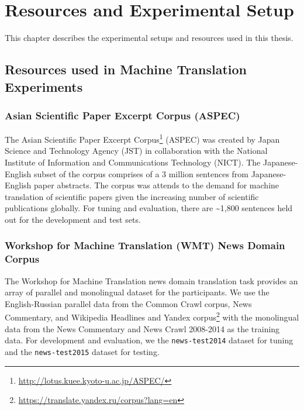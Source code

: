 \chapter{Resources and Experimental Setup}
\label{chap:setup}

This chapter describes the experimental setups and resources used in this thesis.

\section{Resources used in Machine Translation Experiments}

\subsection{Asian Scientific Paper Excerpt Corpus (ASPEC)}

The Asian Scientific Paper Excerpt Corpus\footnote{\url{http://lotus.kuee.kyoto-u.ac.jp/ASPEC/}} (ASPEC) was created by Japan Science and Technology Agency (JST) in collaboration with the National Institute of Information and Communications Technology (NICT). 
The Japanese-English subset of the corpus comprises of a 3 million sentences from Japanese-English paper abstracts. The corpus was attends to the demand for machine translation of scientific papers given the increasing number of scientific publications globally. 
For tuning and evaluation, there are \textasciitilde 1,800 sentences held out for the development and test sets.


\subsection{Workshop for Machine Translation (WMT) News Domain Corpus}

The Workshop for Machine Translation news domain translation task provides an array of parallel and monolingual dataset for the participants. We use the English-Russian parallel data from the Common Crawl corpus, News Commentary, and Wikipedia Headlines and Yandex corpus\footnote{\url{https://translate.yandex.ru/corpus?lang=en}} with the monolingual data from the News Commentary and News Crawl 2008-2014 as the training data. For development and evaluation, we the \texttt{news-test2014} dataset for tuning and the \texttt{news-test2015} dataset for testing.


